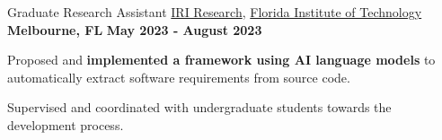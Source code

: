 \begin{cventries}
\cventry
{Graduate Research Assistant}
{\href{https://www.fit.edu/faculty-profiles/s/slhoub-khaled-/}{IRI Research},  \href{www.fit.edu}{Florida Institute of Technology}}
{\textbf{Melbourne, FL}}
{\textbf{May 2023 - August 2023}}
{
\begin{cvitems}
\item Proposed and \textbf{implemented a framework using AI language models} to automatically extract software requirements from source code.
\item Supervised and coordinated with undergraduate students towards the development process.
\end{cvitems}
}



\end{cventries}
